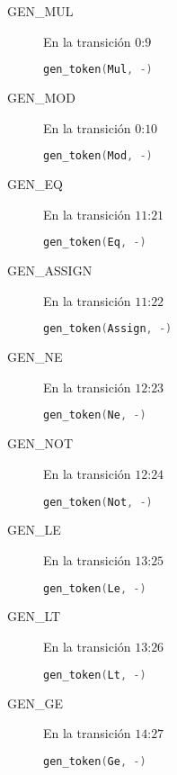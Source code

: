 \documentclass[a4paper]{CSMakotoTechnicalReport}
\begin{document}
\begin{multicols}{2}
\begin{description}
        \item[GEN\_MUL] En la transición $0$:$9$
            \begin{lstlisting}[language=C]
 gen_token(Mul, -)
            \end{lstlisting}

        \item[GEN\_MOD] En la transición $0$:$10$
            \begin{lstlisting}[language=C]
 gen_token(Mod, -)
            \end{lstlisting}

        \item[GEN\_EQ] En la transición $11$:$21$
            \begin{lstlisting}[language=C]
 gen_token(Eq, -)
            \end{lstlisting}

        \item[GEN\_ASSIGN] En la transición $11$:$22$
            \begin{lstlisting}[language=C]
 gen_token(Assign, -)
            \end{lstlisting}

        \item[GEN\_NE] En la transición $12$:$23$
            \begin{lstlisting}[language=C]
 gen_token(Ne, -)
            \end{lstlisting}

        \item[GEN\_NOT] En la transición $12$:$24$
            \begin{lstlisting}[language=C]
 gen_token(Not, -)
            \end{lstlisting}

        \item[GEN\_LE] En la transición $13$:$25$
            \begin{lstlisting}[language=C]
 gen_token(Le, -)
            \end{lstlisting}

        \item[GEN\_LT] En la transición $13$:$26$
            \begin{lstlisting}[language=C]
 gen_token(Lt, -)
            \end{lstlisting}

        \item[GEN\_GE] En la transición $14$:$27$
            \begin{lstlisting}[language=C]
 gen_token(Ge, -)
            \end{lstlisting}


\end{description}
\end{multicols}
\end{document}
